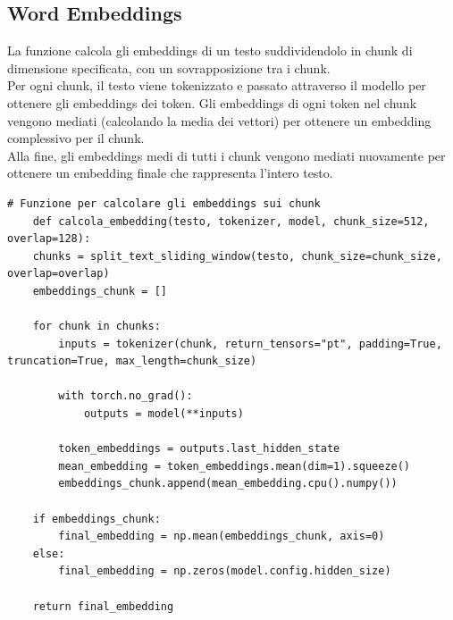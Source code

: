 \documentclass{article}
\begin{document}
		\subsection{Word Embeddings}
La funzione calcola gli embeddings di un testo suddividendolo in chunk di dimensione specificata, con un sovrapposizione tra i chunk. \\Per ogni chunk, il testo viene tokenizzato e passato attraverso il modello per ottenere gli embeddings dei token.
\newpage
Gli embeddings di ogni token nel chunk vengono mediati (calcolando la media dei vettori) per ottenere un embedding complessivo per il chunk.\\ Alla fine, gli embeddings medi di tutti i chunk vengono mediati nuovamente per ottenere un embedding finale che rappresenta l'intero testo.		
	\begin{lstlisting}
# Funzione per calcolare gli embeddings sui chunk
	def calcola_embedding(testo, tokenizer, model, chunk_size=512, overlap=128):
	chunks = split_text_sliding_window(testo, chunk_size=chunk_size, overlap=overlap)
	embeddings_chunk = []
	
	for chunk in chunks:
		inputs = tokenizer(chunk, return_tensors="pt", padding=True, truncation=True, max_length=chunk_size)

		with torch.no_grad():
			outputs = model(**inputs)

		token_embeddings = outputs.last_hidden_state
		mean_embedding = token_embeddings.mean(dim=1).squeeze()
		embeddings_chunk.append(mean_embedding.cpu().numpy())

	if embeddings_chunk:
		final_embedding = np.mean(embeddings_chunk, axis=0)
	else:
		final_embedding = np.zeros(model.config.hidden_size)
		
	return final_embedding
	\end{lstlisting}	
\end{document}
